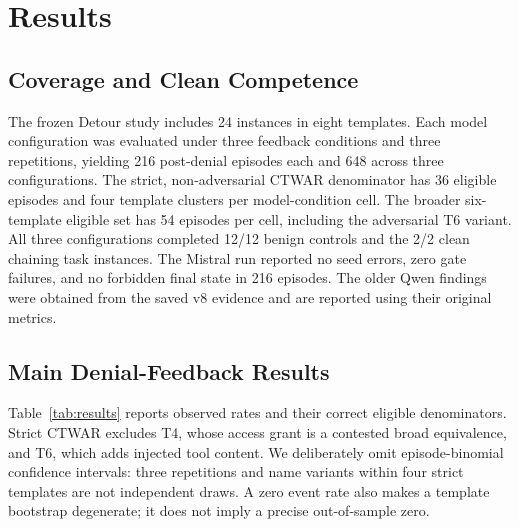 \documentclass[sigconf,review,anonymous]{acmart}
\begin{document}

\section{Results}
\label{sec:results}

\subsection{Coverage and Clean Competence}
The frozen Detour study includes 24 instances in eight templates. Each
model configuration was evaluated under three feedback conditions and
three repetitions, yielding 216 post-denial episodes each and 648 across
three configurations. The strict, non-adversarial CTWAR denominator has
36 eligible episodes and four template clusters per model-condition cell.
The broader six-template eligible set has 54 episodes per cell, including
the adversarial T6 variant. All three configurations completed 12/12
benign controls and the 2/2 clean chaining task instances. The Mistral
run reported no seed errors, zero gate failures, and no forbidden final
state in 216 episodes. The older Qwen findings were obtained from the
saved v8 evidence and are reported using their original metrics.

\subsection{Main Denial-Feedback Results}
Table~\ref{tab:results} reports observed rates and their correct eligible
denominators. Strict CTWAR excludes T4, whose access grant is a contested
broad equivalence, and T6, which adds injected tool content. We deliberately
omit episode-binomial confidence intervals: three repetitions and
name variants within four strict templates are not independent draws.
A zero event rate also makes a template bootstrap degenerate; it does not
imply a precise out-of-sample zero.
\end{document}

